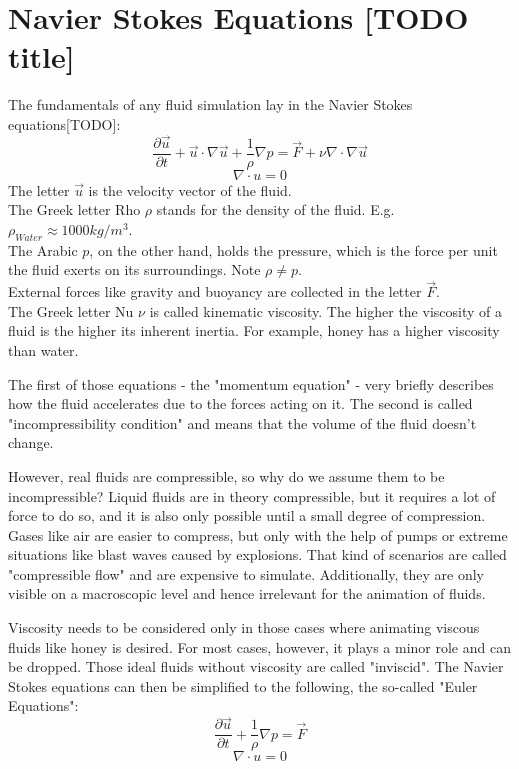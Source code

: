 \chapter{Navier Stokes Equations [TODO title]}\label{chapter:cudapressuresolver}

The fundamentals of any fluid simulation lay in the Navier Stokes equations[TODO]:\\
\begin{equation} \label{navier-stokes1}
    \frac{\partial \vec{u}}{\partial t} + \vec{u} \cdot \nabla \vec{u} + \frac{1}{\rho}  \nabla p = \vec{F} + \nu \nabla \cdot \nabla \vec{u}
\end{equation}
\begin{equation} \label{navier-stokes2}
    \nabla \cdot u = 0
\end{equation}
The letter $\vec{u}$ is the velocity vector of the fluid.\\
The Greek letter Rho $\rho$ stands for the density of the fluid. E.g. $\rho_{Water} \approx 1000 kg/m^3$. \\
The Arabic $p$, on the other hand, holds the pressure, which is the force per unit the fluid exerts on its surroundings. Note $\rho \neq p$.\\
External forces like gravity and buoyancy are collected in the letter $\vec{F}$.\\
The Greek letter Nu $\nu$ is called kinematic viscosity. The higher the viscosity of a fluid is the higher its inherent inertia. For example, honey has a higher viscosity than water.\\
\par The first of those equations - the "momentum equation" - very briefly describes how the fluid accelerates due to the forces acting on it. The second is called "incompressibility condition" and means that the volume of the fluid doesn't change.
\par However, real fluids are compressible, so why do we assume them to be incompressible? Liquid fluids are in theory compressible, but it requires a lot of force to do so, and it is also only possible until a small degree of compression. Gases like air are easier to compress, but only with the help of pumps or extreme situations like blast waves caused by explosions. That kind of scenarios are called "compressible flow" and are expensive to simulate. Additionally, they are only visible on a macroscopic level and hence irrelevant for the animation of fluids.
\par Viscosity needs to be considered only in those cases where animating viscous fluids like honey is desired. For most cases, however, it plays a minor role and can be dropped. Those ideal fluids without viscosity are called "inviscid". The Navier Stokes equations can then be simplified to the following, the so-called "Euler Equations":
\begin{equation} \label{euler-equation1}
    \frac{\partial \vec{u}}{\partial t} + \frac{1}{\rho}  \nabla p = \vec{F}
\end{equation}
\begin{equation} \label{euler-equation2}
    \nabla \cdot u = 0
\end{equation}


